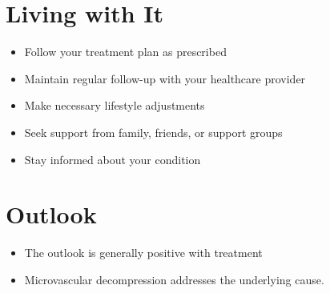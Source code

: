 \section{Living with It}
\begin{itemize}[noitemsep]
  \item Follow your treatment plan as prescribed
  \item Maintain regular follow-up with your healthcare provider
  \item Make necessary lifestyle adjustments
  \item Seek support from family, friends, or support groups
  \item Stay informed about your condition
\end{itemize}
\section{Outlook}
\begin{itemize}[noitemsep]
  \item The outlook is generally positive with treatment
  \item Microvascular decompression addresses the underlying cause.
\end{itemize}
